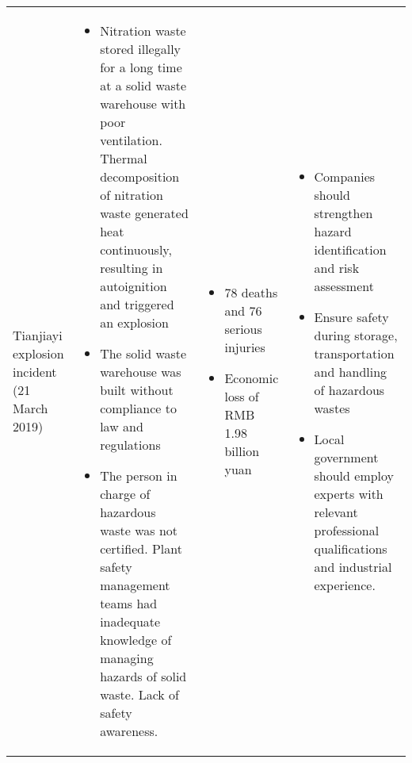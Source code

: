 {\begin{tabular}{@{}p{3cm}p{8cm}p{4cm}p{7cm}@{}}
Tianjiayi explosion incident (21 March 2019) \cite{you_summary_2020}                                                    & \begin{itemize}[leftmargin=1em]\item Nitration waste stored illegally for a long time at a solid waste warehouse with poor ventilation. Thermal decomposition of nitration waste generated heat continuously, resulting in autoignition and triggered an explosion\item The solid waste warehouse was built without compliance to law and regulations\item The person in charge of hazardous waste was not certified. Plant safety management teams had inadequate knowledge of managing hazards of solid waste. Lack of safety awareness.\end{itemize}                                                                                                                                                                                     & \begin{itemize}[leftmargin=1em]\item 78 deaths and 76 serious injuries \item Economic loss of RMB 1.98 billion yuan\end{itemize}                                                                                                                                                                      & \begin{itemize}[leftmargin=1em]\item Companies should strengthen hazard identification and risk assessment \item Ensure safety during storage, transportation and handling of hazardous wastes\item Local government should employ experts with relevant professional qualifications and industrial experience.\end{itemize}                                                                                                                                                                                                                                                                                            \\

\end{tabular}}

